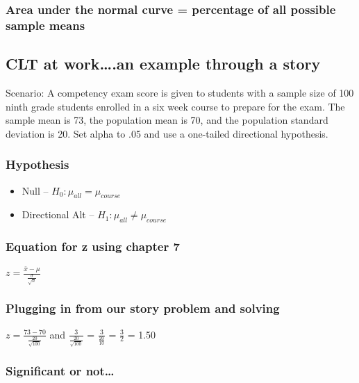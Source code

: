 \documentclass[]{article}
\begin{document}
\subsubsection{Area under the normal curve = percentage of all possible
sample
means}\label{area-under-the-normal-curve-percentage-of-all-possible-sample-means}

\subsection{CLT at work\ldots{}.an example through a
story}\label{clt-at-work.an-example-through-a-story}

Scenario: A competency exam score is given to students with a sample
size of 100 ninth grade students enrolled in a six week course to
prepare for the exam. The sample mean is 73, the population mean is 70,
and the population standard deviation is 20. Set alpha to .05 and use a
one-tailed directional hypothesis.

\subsubsection{Hypothesis}\label{hypothesis}

\begin{itemize}
\itemsep1pt\parskip0pt
\item
  Null -- $H_0: \mu_{all} = \mu_{course}$
\item
  Directional Alt -- $H_1: \mu_{all} ≠ \mu_{course}$
\end{itemize}

\subsubsection{Equation for z using chapter
7}\label{equation-for-z-using-chapter-7}

$z = \frac{\bar{x}-\mu}{\frac{\sigma}{\sqrt{n}}}$

\subsubsection{Plugging in from our story problem and
solving}\label{plugging-in-from-our-story-problem-and-solving}

$z = \frac{73-70}{\frac{20}{\sqrt{100}}}$ and
$\frac{3}{\frac{20}{\sqrt{100}}}$ = $\frac{3}{\frac{20}{10}}$ =
$\frac{3}{2}$ = 1.50

\subsubsection{Significant or not\ldots{}}\label{significant-or-not}
\end{document}
